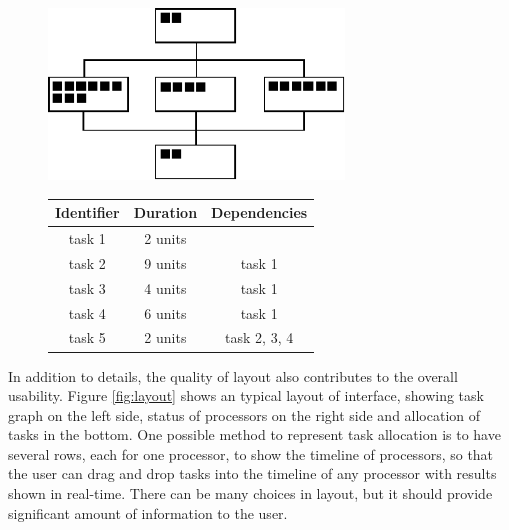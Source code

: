 \documentclass[a4paper,11pt]{article}
\begin{document}
\begin{figure}
\begin{minipage}{\textwidth}
    \vspace{1em}
    \hfill
    \begin{minipage}[b]{0.4\textwidth}
        \centering
        \includegraphics[width=0.7\textwidth]{repr.pdf}
        \vspace{0.5em}
        \label{fig:repr}
    \end{minipage}
    \hfill
    \begin{minipage}[b]{0.49\textwidth}
        \center
        \begin{tabular}{ccc}\hline
            Identifier & Duration & Dependencies \\ \hline
            task 1 & 2 units &  \\
            task 2 & 9 units & task 1 \\
            task 3 & 4 units & task 1 \\
            task 4 & 6 units & task 1\\
            task 5 & 2 units & task 2, 3, 4 \\ \hline
        \end{tabular}
        \label{tab:repr}
    \end{minipage}
    \hfill
    \vspace{1em}
\end{minipage}
\end{figure}

In addition to details, the quality of layout also contributes to the overall usability. Figure \ref{fig:layout} shows an typical layout of interface, showing task graph on the left side, status of processors on the right side and allocation of tasks in the bottom. One possible method to represent task allocation is to have several rows, each for one processor, to show the timeline of processors, so that the user can drag and drop tasks into the timeline of any processor with results shown in real-time. There can be many choices in layout, but it should provide significant amount of information to the user.
\end{document}
